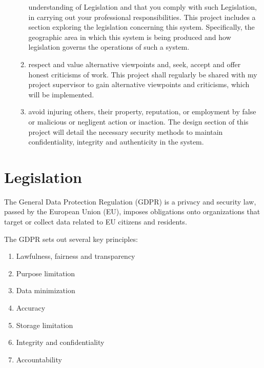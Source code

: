 \documentclass{report}
\begin{document}
\begin{flushleft}
\begin{enumerate}
\begin{enumerate}
    understanding of Legislation and that you comply
    with such Legislation, in carrying out your
    professional responsibilities.
    This project includes a section exploring the
    legislation concerning this system. Specifically, the
    geographic area in which this system is being
    produced and how legislation governs the operations
    of such a system.
    \item respect and value alternative viewpoints and,
    seek, accept and offer honest criticisms of work.
    This project shall regularly be shared with my project
    supervisor to gain alternative viewpoints and
    criticisms, which will be implemented.
    \item avoid injuring others, their property, reputation,
    or employment by false or malicious or negligent
    action or inaction.
    The design section of this project will detail the
    necessary security methods to maintain
    confidentiality, integrity and authenticity in the
    system. %
 \end{enumerate}
 \end{enumerate}

 \section{Legislation}
 The General Data Protection Regulation (GDPR) is a privacy
 and security law, passed by the European Union (EU),
 imposes obligations onto organizations that target or collect
 data related to EU citizens and residents.\linebreak[1]

The GDPR sets out several key principles:
\begin{enumerate}
  \item Lawfulness, fairness and transparency
  \item Purpose limitation
  \item Data minimization
  \item Accuracy
  \item Storage limitation
  \item Integrity and confidentiality
  \item Accountability
\end{enumerate}


\end{flushleft}
\end{document}
